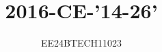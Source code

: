 \documentclass[journal]{IEEEtran}
\begin{document}

\vspace{3cm}


\title{2016-CE-'14-26'}
\author{EE24BTECH11023}

{\let\newpage\relax\maketitle}

\renewcommand{\thefigure}{\theenumi}
\renewcommand{\thetable}{\theenumi}
\setlength{\intextsep}{10pt} %


\renewcommand{\thetable}{\theenumi}
\end{document}

